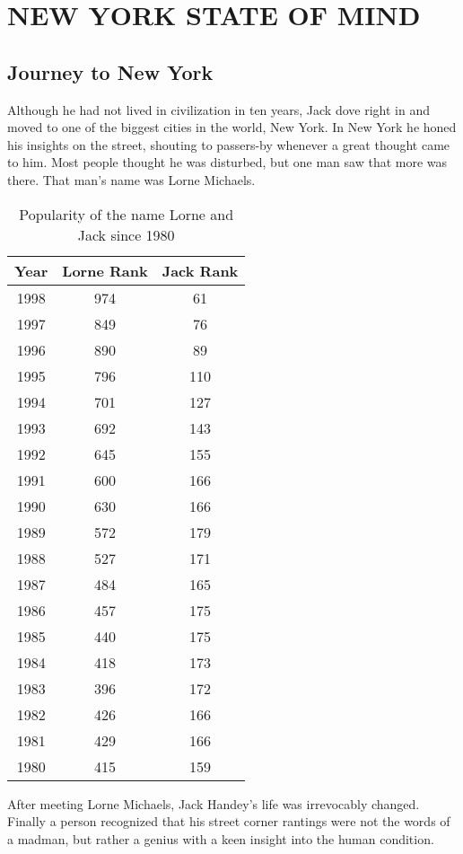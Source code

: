 \chapter{NEW YORK STATE OF MIND} \label{ch:New York}%

\section{Journey to New York} \label{sec:Jack New York} %

Although he had not lived in civilization in ten years, Jack dove right in and moved to one of the biggest cities in the world, New York.  In New York he honed his insights on the street, shouting to passers-by whenever a great thought came to him.  Most people thought he was disturbed, but one man saw that more was there.  That man's name was Lorne Michaels.  

\begin{table}[htbp]
  \centering
    \begin{tabular}{ccc}
    \toprule
    \textbf{Year} & \textbf{Lorne Rank} & \textbf{Jack Rank} \cite{SSA2016} \\
    \midrule
    1998  & 974   & 61 \\
    1997  & 849   & 76 \\
    1996  & 890   & 89 \\
    1995  & 796   & 110 \\
    1994  & 701   & 127 \\
    1993  & 692   & 143 \\
    1992  & 645   & 155 \\
    1991  & 600   & 166 \\
    1990  & 630   & 166 \\
    1989  & 572   & 179 \\
    1988  & 527   & 171 \\
    1987  & 484   & 165 \\
    1986  & 457   & 175 \\
    1985  & 440   & 175 \\
    1984  & 418   & 173 \\
    1983  & 396   & 172 \\
    1982  & 426   & 166 \\
    1981  & 429   & 166 \\
    1980  & 415   & 159 \\
    \bottomrule
    \end{tabular}%
  \caption{Popularity of the name Lorne and Jack since 1980}
  \label{tab:Popularity of Lorne and Jack}%
\end{table}%

After meeting Lorne Michaels, Jack Handey's life was irrevocably changed.  Finally a person recognized that his street corner rantings were not the words of a madman, but rather a genius with a keen insight into the human condition.
